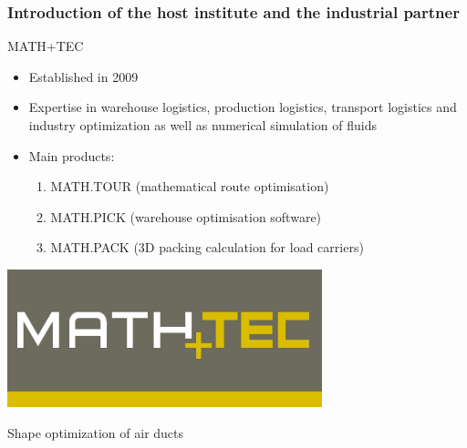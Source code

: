 \documentclass[8pt]{beamer}
\begin{document}
\begin{frame}
  \frametitle{Introduction of the host institute and the industrial
    partner}
  \begin{minipage}{\linewidth}
    \begin{minipage}{0.725\linewidth}
      \Large{MATH+TEC}
            {\small
              \begin{itemize}
              \item Established in 2009
              \item Expertise in warehouse logistics, production logistics,
                transport logistics and industry optimization as well as numerical
                simulation of fluids
              \item Main products:
                \begin{enumerate}
                \item MATH.TOUR (mathematical route optimisation)
                \item MATH.PICK (warehouse optimisation software)
                \item MATH.PACK (3D packing calculation for load carriers)
                \end{enumerate}
              \end{itemize}
            }
    \end{minipage}
    \hspace{0.5cm}
    \begin{minipage}{0.2\linewidth}
      \includegraphics[scale=0.25]{logoMathTec.png}
    \end{minipage}
  \end{minipage}
\end{frame}
%
\begin{frame}
  \centering
  \Huge Shape optimization of air ducts
\end{frame}
\end{document}

